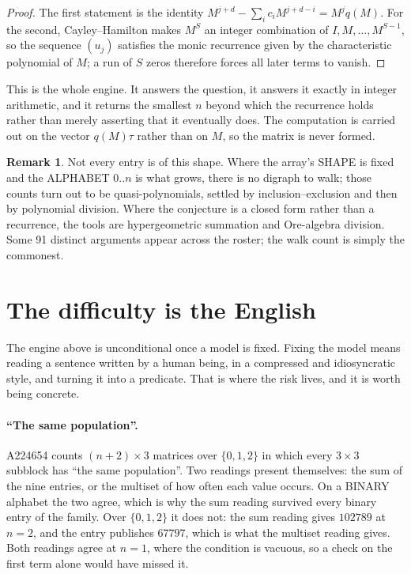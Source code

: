 \documentclass[11pt,a4paper]{article}
\theoremstyle{plain}
\theoremstyle{definition}
\newtheorem{remark}[theorem]{Remark}
\begin{document}
\begin{proof}
The first statement is the identity
$M^{j+d}-\sum_ic_iM^{j+d-i}=M^{j}q(M)$. For the second, Cayley--Hamilton makes $M^{S}$ an
integer combination of $I,M,\dots,M^{S-1}$, so the sequence $(u_j)$ satisfies the monic
recurrence given by the characteristic polynomial of $M$; a run of $S$ zeros therefore forces
all later terms to vanish.
\end{proof}

This is the whole engine. It answers the question, it answers it exactly in integer arithmetic,
and it returns the smallest $n$ beyond which the recurrence holds rather than merely asserting
that it eventually does. The computation is carried out on the vector $q(M)\tau$ rather than on
$M$, so the matrix is never formed.

\begin{remark}
Not every entry is of this shape. Where the array's SHAPE is fixed and the ALPHABET $0..n$ is
what grows, there is no digraph to walk; those counts turn out to be quasi-polynomials, settled
by inclusion--exclusion and then by polynomial division. Where the conjecture is a closed form
rather than a recurrence, the tools are hypergeometric summation and Ore-algebra division. Some
91 distinct arguments appear across the roster; the walk count is simply the commonest.
\end{remark}

\section{The difficulty is the English}

The engine above is unconditional once a model is fixed. Fixing the model means reading a
sentence written by a human being, in a compressed and idiosyncratic style, and turning it into
a predicate. That is where the risk lives, and it is worth being concrete.

\paragraph{``The same population''.}
A224654 counts $(n+2)\times3$ matrices over $\{0,1,2\}$ in which every
$3\times3$ subblock has ``the same population''. Two readings present themselves: the sum of
the nine entries, or the multiset of how often each value occurs. On a BINARY alphabet the two
agree, which is why the sum reading survived every binary entry of the family. Over
$\{0,1,2\}$ it does not: the sum reading gives $102789$ at $n=2$, and the entry publishes
$67797$, which is what the multiset reading gives. Both readings agree at $n=1$, where the
condition is vacuous, so a check on the first term alone would have missed it.
\end{document}
